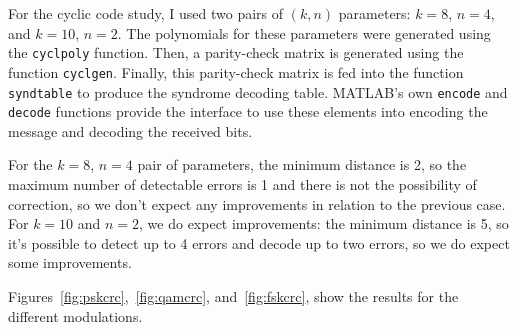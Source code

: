 For the cyclic code study, I used two pairs of \((k,n)\) parameters: \(k=8\),
\(n=4\), and \(k=10\), \(n=2\). The polynomials for these parameters were
generated using the {\tt cyclpoly} function. Then, a parity-check matrix is
generated using the function {\tt cyclgen}. Finally, this parity-check matrix is
fed into the function {\tt syndtable} to produce the syndrome decoding table.
MATLAB's own {\tt encode} and {\tt decode} functions provide the interface to use
these elements into encoding the message and decoding the received bits.

For the \(k=8\), \(n=4\) pair of parameters, the minimum distance is 2, so the
maximum number of detectable errors is 1 and there is not the possibility of
correction, so we don't expect any improvements in relation to the previous case.
For \(k=10\) and \(n=2\), we do expect improvements: the minimum distance is 5, so
it's possible to detect up to 4 errors and decode up to two errors, so we do
expect some improvements.

Figures~\ref{fig:pskcrc},~\ref{fig:qamcrc}, and~\ref{fig:fskcrc}, show the results
for the different modulations.

